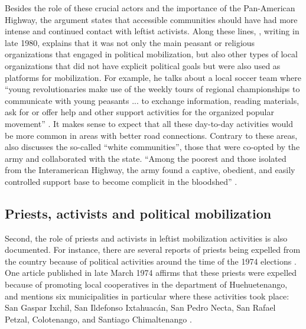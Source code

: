 \documentclass[12pt, notitlepage]{article}
\begin{document}

Besides the role of these crucial actors and the importance of the Pan-American Highway, the argument states that accessible communities should have had more intense and continued contact with leftist activists.
Along these lines, \citet{Bran:1985tc}, writing in late 1980, explains that it was not only the main peasant or religious organizations that engaged in political mobilization, but also other types of local organizations that did not have explicit political goals but were also used as platforms for mobilization.
For example, he talks about a local soccer team where ``young revolutionaries make use of the weekly tours of regional championships to communicate with young peasants ... to exchange information, reading materials, ask for or offer help and other support activities for the organized popular movement'' \citep[15]{Bran:1985tc}.
It makes sense to expect that all these day-to-day activities would be more common in areas with better road connections.
Contrary to these areas, \citet{Esparza:2018uw} also discusses the so-called ``white communities'', those that were co-opted by the army and collaborated with the state.
``Among the poorest and those isolated from the Interamerican Highway, the army found a captive, obedient, and easily controlled support base to become complicit in the bloodshed'' \citet[138]{Esparza:2018uw}.

\subsection*{Priests, activists and political mobilization}

Second, the role of priests and activists in leftist mobilization activities is also documented.
For instance, there are several reports of priests being expelled from the country because of political activities around the time of the 1974 elections \citep{Imparcial:1974ab, Imparcial:1974uz}.
One article published in late March 1974 affirms that these priests were expelled because of promoting local cooperatives in the department of Huehuetenango, and mentions six municipalities in particular where these activities took place: San Gaspar Ixchil, San Ildefonso Ixtahuacán, San Pedro Necta, San Rafael Petzal, Colotenango, and Santiago Chimaltenango \citep{Imparcial:1974aa}.
\end{document}
